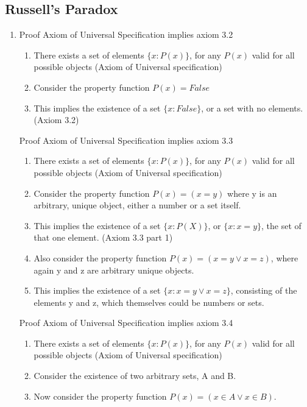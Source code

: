 \documentclass{article}
\begin{document}
    \subsection{Russell's Paradox}
    \begin{enumerate}
        \item Proof Axiom of Universal Specification implies axiom 3.2
            \begin{enumerate}
                \item There exists a set of elements $\{x : P(x)\}$, for any $P(x)$ valid for all possible objects (Axiom of Universal specification)
                \item Consider the property function $P(x) = False$
                \item This implies the existence of a set $\{x : False\}$, or a set with no elements. (Axiom 3.2)
            \end{enumerate}
            Proof Axiom of Universal Specification implies axiom 3.3
            \begin{enumerate}
                \item There exists a set of elements $\{x : P(x)\}$, for any $P(x)$ valid for all possible objects (Axiom of Universal specification)
                \item Consider the property function $P(x) = (x = y)$ where y is an arbitrary, unique object, either a number or a set itself.
                \item This implies the existence of a set $\{x : P(X) \}$, or $\{x : x = y\}$, the set of that one element. (Axiom 3.3 part 1)
                \item Also consider the property function $P(x) = (x = y \lor x = z)$, where again y and z are arbitrary unique objects.
                \item This implies the existence of a set $\{x : x = y \lor x = z\}$, consisting of the elements y and z, which themselves could be numbers or sets.
            \end{enumerate}
            Proof Axiom of Universal Specification implies axiom 3.4
            \begin{enumerate}
                \item There exists a set of elements $\{x : P(x)\}$, for any $P(x)$ valid for all possible objects (Axiom of Universal specification)
                \item Consider the existence of two arbitrary sets, A and B.
                \item Now consider the property function $P(x) = (x \in A \lor x \in B)$.

\end{enumerate}
\end{enumerate}
\end{document}
